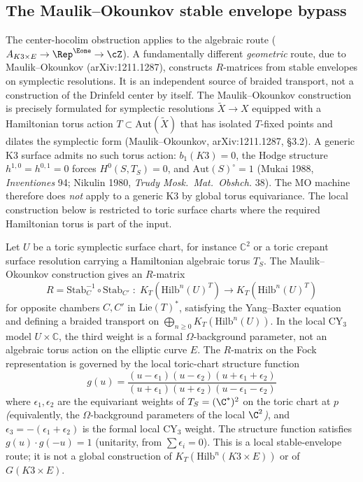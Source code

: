 \subsection{The Maulik--Okounkov stable envelope bypass}
\label{subsec:mo-bypass-k3e}

The center-hocolim obstruction applies to the algebraic route
($A_{K3 \times E} \to \Rep^{\Eone} \to \cZ$). A fundamentally
different \emph{geometric} route, due to Maulik--Okounkov
(arXiv:1211.1287), constructs \(R\)-matrices from stable envelopes
on symplectic resolutions. It is an independent source of braided
transport, not a construction of the Drinfeld center by itself. The
Maulik--Okounkov
construction is precisely formulated for symplectic resolutions
$\widetilde{X} \to X$ equipped with a Hamiltonian torus action
$T \subset \mathrm{Aut}(\widetilde{X})$ that has isolated
$T$-fixed points and dilates the symplectic form
(Maulik--Okounkov, arXiv:1211.1287, \S3.2).
A generic K3 surface admits no such torus action: $b_1(K3) = 0$,
the Hodge structure $h^{1,0} = h^{0,1} = 0$ forces
$H^0(S, T_S) = 0$, and $\mathrm{Aut}(S)^\circ = 1$
(Mukai 1988, \emph{Inventiones} 94; Nikulin 1980,
\emph{Trudy Mosk.\ Mat.\ Obshch.} 38).
The MO machine therefore does \emph{not} apply to a generic K3 by
global torus equivariance. The local construction below is restricted
to toric surface charts where the required Hamiltonian torus is part of
the input.

\begin{proposition}
\label{prop:mo-bypass}
Let \(U\) be a toric symplectic surface chart, for instance
\(\mathbb C^2\) or a toric crepant surface resolution carrying a
Hamiltonian algebraic torus \(T_S\). The Maulik--Okounkov construction
gives an \(R\)-matrix
\[
 R = \mathrm{Stab}_C^{-1} \circ \mathrm{Stab}_{C'}
 \;\colon\; K_T(\mathrm{Hilb}^n(U)^T) \to K_T(\mathrm{Hilb}^n(U)^T)
\]
for opposite chambers $C, C'$ in $\mathrm{Lie}(T)^*$, satisfying
the Yang--Baxter equation and defining a braided transport on
\(\bigoplus_{n\geq0}K_T(\mathrm{Hilb}^n(U))\). In the local
CY$_3$ model \(U\times \mathbb C\), the third weight is a formal
\(\Omega\)-background parameter, not an algebraic torus action on the
elliptic curve \(E\). The $R$-matrix on the Fock representation is governed by
the local toric-chart structure function
\begin{equation}
\label{eq:k3e-structure-function}
 g(u) = \frac{(u - \epsilon_1)(u - \epsilon_2)(u + \epsilon_1 + \epsilon_2)}{(u + \epsilon_1)(u + \epsilon_2)(u - \epsilon_1 - \epsilon_2)}
\end{equation}
where $\epsilon_1, \epsilon_2$ are the equivariant weights of
$T_S = (\C^*)^2$ on the toric chart at $p$ \emph{(}equivalently,
the $\Omega$-background parameters of the local $\C^2$\emph{)}, and
\(\epsilon_3=-(\epsilon_1+\epsilon_2)\) is the formal local CY$_3$
weight.
The structure function satisfies $g(u) \cdot g(-u) = 1$
\textup{(}unitarity, from $\sum \epsilon_i = 0$\textup{).} This is a
local stable-envelope route; it is not a global construction of
\(K_T(\mathrm{Hilb}^n(K3\times E))\) or of \(G(K3\times E)\).
\end{proposition}

